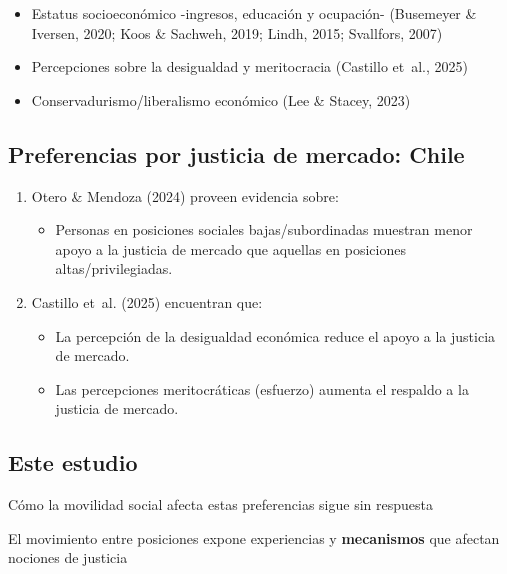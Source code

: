 \documentclass[
  spanish,
  letterpaper,
  DIV=11,
  numbers=noendperiod,
  oneside]{scrartcl}
\providecommand{\tightlist}{%
  \setlength{\itemsep}{0pt}\setlength{\parskip}{0pt}}
\begin{document}
\begin{itemize}
\tightlist
\item
  Estatus socioeconómico -ingresos, educación y ocupación- (Busemeyer \&
  Iversen, 2020; Koos \& Sachweh, 2019; Lindh, 2015; Svallfors, 2007)
\item
  Percepciones sobre la desigualdad y meritocracia (Castillo et~al.,
  2025)
\item
  Conservadurismo/liberalismo económico (Lee \& Stacey, 2023)
\end{itemize}

\subsection{Preferencias por justicia de mercado:
Chile}\label{preferencias-por-justicia-de-mercado-chile}

\begin{enumerate}
\def\labelenumi{\arabic{enumi}.}
\item
  Otero \& Mendoza (2024) proveen evidencia sobre:

  \begin{itemize}
  \tightlist
  \item
    Personas en posiciones sociales bajas/subordinadas muestran menor
    apoyo a la justicia de mercado que aquellas en posiciones
    altas/privilegiadas.
  \end{itemize}
\item
  Castillo et~al. (2025) encuentran que:

  \begin{itemize}
  \tightlist
  \item
    La percepción de la desigualdad económica reduce el apoyo a la
    justicia de mercado.
  \item
    Las percepciones meritocráticas (esfuerzo) aumenta el respaldo a la
    justicia de mercado.
  \end{itemize}
\end{enumerate}

\subsection{Este estudio}\label{este-estudio}

Cómo la movilidad social afecta estas preferencias sigue sin respuesta

El movimiento entre posiciones expone experiencias y \textbf{mecanismos}
que afectan nociones de justicia

\section{}\label{section}
\end{document}
